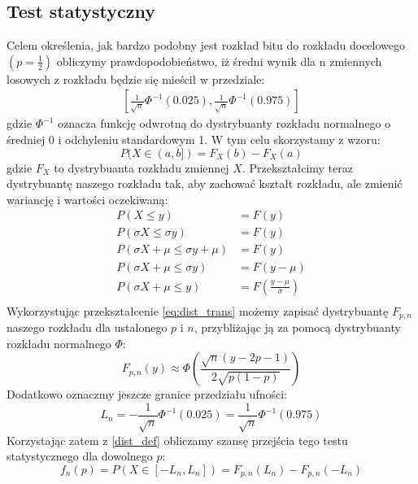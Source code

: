 \subsection{Test statystyczny}
Celem określenia, jak bardzo podobny jest rozkład bitu do rozkładu docelowego $(p = \frac{1}{2})$ obliczymy prawdopodobieństwo, iż średni wynik dla n zmiennych losowych z rozkładu będzie się mieścił w przedziale: \begin{align*}
    \left[\frac{1}{\sqrt{n}}\Phi^{-1}(0.025), \frac{1}{\sqrt{n}}\Phi^{-1}(0.975)\right]
\end{align*}
gdzie $\Phi^{-1}$ oznacza funkcję odwrotną do dystrybuanty rozkładu normalnego o średniej 0 i odchyleniu standardowym 1. W tym celu skorzystamy z wzoru:
\begin{equation} \label{dist_def}
    P(X \in (a, b]) = F_X(b) - F_X(a)
\end{equation}
gdzie $F_X$ to dystrybuanta rozkładu zmiennej $X$. Przekształcimy teraz dystrybuantę naszego rozkładu tak, aby zachować kształt rozkładu, ale zmienić wariancję i wartości oczekiwaną:
\begin{equation}
\label{eq:dist_trans}
\begin{split}
P(X \leq y) &= F(y) \\
P(\sigma X \leq \sigma y) &= F(y) \\
P(\sigma X + \mu \leq \sigma y + \mu) &= F(y) \\
P(\sigma X + \mu \leq \sigma y) &= F(y - \mu) \\
P(\sigma X + \mu \leq y) &= F\left(\frac{y - \mu}{\sigma}\right) \\
\end{split}
\end{equation}
Wykorzystując przekształcenie \ref{eq:dist_trans} możemy zapisać dystrybuantę $F_{p, n}$ naszego rozkładu dla ustalonego $p$ i $n$, przybliżając ją za pomocą dystrybuanty rozkładu normalnego $\Phi$:
\begin{equation}
    F_{p, n}(y) \approx \Phi \left(\frac{\sqrt{n}(y - 2p - 1)}{2\sqrt{p(1-p)}}\right)
\end{equation}
Dodatkowo oznaczmy jeszcze granice przedziału ufności: 
\begin{equation}
    L_n = -\frac{1}{\sqrt{n}}\Phi^{-1}(0.025) = \frac{1}{\sqrt{n}}\Phi^{-1}(0.975)
\end{equation}
Korzystając zatem z \ref{dist_def} obliczamy szansę przejścia tego testu statystycznego dla dowolnego $p$:
\begin{equation}
    f_n(p)=P\left(X\in [-L_n, L_n]\right) = F_{p, n}(L_n) - F_{p, n}(-L_n)
\end{equation}
